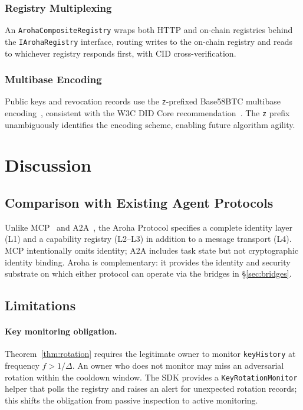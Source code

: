 \documentclass[conference]{IEEEtran}
\begin{document}
\subsubsection{Registry Multiplexing}
An \texttt{ArohaCompositeRegistry} wraps both HTTP and on-chain
registries behind the \texttt{IArohaRegistry} interface, routing
writes to the on-chain registry and reads to whichever registry
responds first, with CID cross-verification.

\subsubsection{Multibase Encoding}
Public keys and revocation records use the
\texttt{z}-prefixed Base58BTC multibase
encoding~\cite{w3c2021multibase}, consistent with the W3C DID
Core recommendation~\cite{w3c2022did}. The \texttt{z} prefix
unambiguously identifies the encoding scheme, enabling
future algorithm agility.

\section{Discussion}
\label{sec:discussion}

\subsection{Comparison with Existing Agent Protocols}

Unlike MCP~\cite{anthropic2024mcp} and A2A~\cite{google2024a2a},
the Aroha Protocol specifies a complete identity layer (L1) and
a capability registry (L2--L3) in addition to a message transport
(L4). MCP intentionally omits identity; A2A includes task state
but not cryptographic identity binding. Aroha is complementary:
it provides the identity and security substrate on which either
protocol can operate via the bridges in \S\ref{sec:bridges}.

\subsection{Limitations}

\paragraph{Key monitoring obligation.}
Theorem~\ref{thm:rotation} requires the legitimate owner to
monitor \texttt{keyHistory} at frequency $f > 1/\Delta$. An
owner who does not monitor may miss an adversarial rotation
within the cooldown window. The SDK provides a
\texttt{KeyRotationMonitor} helper that polls the registry and
raises an alert for unexpected rotation records; this shifts the
obligation from passive inspection to active monitoring.
\end{document}
